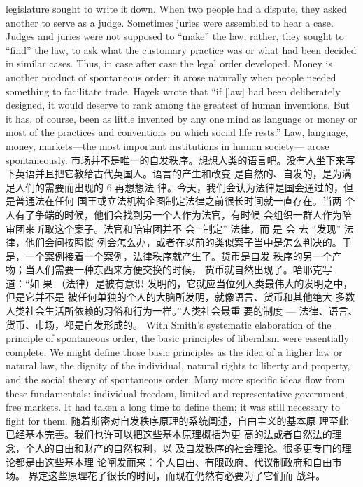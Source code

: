 \begin{paracol}{2}
legislature sought to write it down. When two people had a
dispute, they asked another to serve as a judge. Sometimes juries were assembled to hear a case. Judges and juries were not
supposed to ``make'' the law; rather, they sought to ``find'' the
law, to ask what the customary practice was or what had been
decided in similar cases. Thus, in case after case the legal order
developed. Money is another product of spontaneous order; it
arose naturally when people needed something to facilitate
trade. Hayek wrote that ``if [law] had been deliberately designed, it would deserve to rank among the greatest of human
inventions. But it has, of course, been as little invented by any
one mind as language or money or most of the practices and
conventions on which social life rests.'' Law, language, money,
markets---the most important institutions in human society---
arose spontaneously.
\switchcolumn
市场并不是唯一的自发秩序。想想人类的语言吧。没有人坐下来写下英语并且把它教给古代英国人。语言的产生和改变
是自然的、自发的，是为满足人们的需要而出现的 6 再想想法
律。今天，我们会认为法律是国会通过的，但是普通法在任何
国王或立法机构企图制定法律之前很长时间就一直存在。当两
个人有了争端的时候，他们会找到另一个人作为法官，有时候
会组织一群人作为陪审团来听取这个案子。法官和陪审团并不
会 “制定” 法律，而 是 会 去 “发现” 法律，他们会问按照惯
例会怎么办，或者在以前的类似案子当中是怎么判决的。于
是，一个案例接着一个案例，法律秩序就产生了。货币是自发
秩序的另一个产物；当人们需要一种东西来方便交换的时候，
货币就自然出现了。哈耶克写道：“如 果 （法律）是被有意识
发明的，它就应当位列人类最伟大的发明之中，但是它并不是
被任何单独的个人的大脑所发明，就像语言、货币和其他绝大
多数人类社会生活所依赖的习俗和行为一样。”人类社会最重
要的制度 --- 法律、语言、货币、市场，都是自发形成的。
\switchcolumn*
With Smith's systematic elaboration of the principle of spontaneous order, the basic principles of liberalism were essentially
complete. We might define those basic principles as the idea of
a higher law or natural law, the dignity of the individual, natural rights to liberty and property, and the social theory of
spontaneous order. Many more specific ideas flow from these
fundamentals: individual freedom, limited and representative
government, free markets. It had taken a long time to define
them; it was still necessary to fight for them.
\switchcolumn
随着斯密对自发秩序原理的系统阐述，自由主义的基本原
理至此已经基本完善。我们也许可以把这些基本原理概括为更
高的法或者自然法的理念，个人的自由和财产的自然权利，以
及自发秩序的社会理论。很多更专门的理论都是由这些基本理
论阐发而来：个人自由、有限政府、代议制政府和自由市场。
界定这些原理花了很长的时间，而现在仍然有必要为了它们而
战斗。


\end{paracol}

